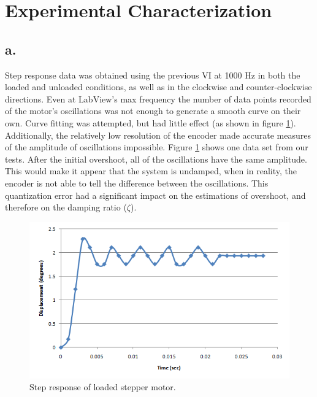 \documentclass{article}
\theoremstyle{plain}
\theoremstyle{definition}
\theoremstyle{remark}
\begin{document}
\clearpage

\section{Experimental Characterization}
\subsection*{a.}
Step response data was obtained using the previous VI at 1000 Hz in both the loaded and unloaded conditions, as well as in the clockwise and counter-clockwise directions. Even at LabView's max frequency the number of data points recorded of the motor's oscillations was not enough to generate a smooth curve on their own. Curve fitting was attempted, but had little effect (as shown in figure \ref{q3a_1}). Additionally, the relatively low resolution of the encoder made accurate measures of the amplitude of oscillations impossible. Figure \ref{q3a_1} shows one data set from our tests. After the initial overshoot, all of the oscillations have the same amplitude. This would make it appear that the system is undamped, when in reality, the encoder is not able to tell the difference between the oscillations. This quantization error had a significant impact on the estimations of overshoot, and therefore on the damping ratio ($\zeta$).\\

\begin{figure}[hbt]
\begin{center}
\includegraphics[width = 14cm]{StepResponse.png}
\caption{Step response of loaded stepper motor.}
\label{q3a_1}
\end{center}
\end{figure}
\end{document}
